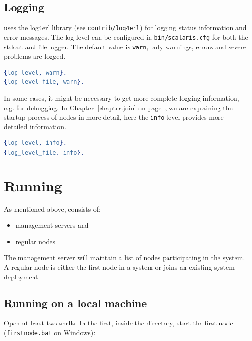 \documentclass[a4paper]{scrreprt}
\newcommand{\sieheref}[1]{\ref{#1} on page~\pageref{#1}}
\newcommand{\code}[1]{\lstinline[basicstyle=\ttfamily]!#1!}
\begin{document}
\subsection{Logging}
\label{sec:logging}

\scalaris{} uses the log4erl library (see \code{contrib/log4erl}) for
logging status information and error messages. The log level can be
configured in \code{bin/scalaris.cfg} for both the stdout and file logger.
The default value is {\tt warn}; only warnings, errors and severe problems are
logged.

\begin{lstlisting}[language=erlang]
%% @doc Loglevel: debug < info < warn < error < fatal < none
{log_level, warn}.
{log_level_file, warn}.
\end{lstlisting}

In some cases, it might be necessary to get more complete logging
information, e.g. for debugging. In Chapter~\sieheref{chapter.join},
we are explaining the startup process of \scalaris{} nodes in more
detail, here the {\tt info} level provides more detailed information.

\begin{lstlisting}[language=erlang]
%% @doc Loglevel: debug < info < warn < error < fatal < none
{log_level, info}.
{log_level_file, info}.
\end{lstlisting}


\section{Running \scalaris{}}

As mentioned above, \scalaris{} consists of:
\begin{itemize}
\setlength{\itemsep}{0pt}
\setlength{\parskip}{0pt}
\item management servers and
\item regular nodes
\end{itemize}

The management server will maintain a list of nodes participating in the
system. A regular node is either the first node in a system or joins an
existing system deployment.

\subsection{Running on a local machine}
\label{sec.boot}

Open at least two shells. In the first, inside the \scalaris{} directory,
start the first node (\code{firstnode.bat} on Windows):
\begin{lstlisting}[language=sh]
%> ./bin/firstnode.sh
\end{lstlisting}
\end{document}
